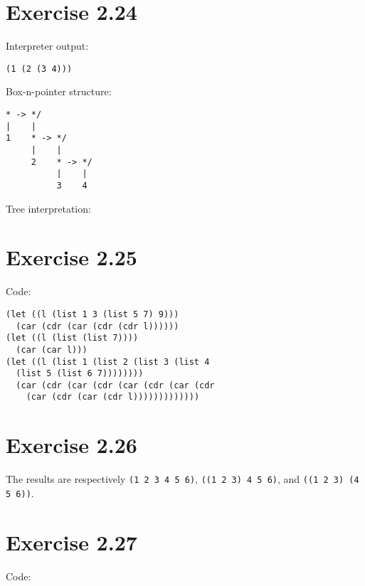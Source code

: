 \documentclass[../main.tex]{subfiles}
\begin{document}
\section{Exercise 2.24}

Interpreter output:

\begin{lstlisting}
(1 (2 (3 4)))
\end{lstlisting}

Box-n-pointer structure:

\begin{lstlisting}
* -> */
|    |
1    * -> */
     |    |
     2    * -> */
          |    |
          3    4
\end{lstlisting}

Tree interpretation:


\section{Exercise 2.25}

Code:

\begin{lstlisting}
(let ((l (list 1 3 (list 5 7) 9)))
  (car (cdr (car (cdr (cdr l))))))
(let ((l (list (list 7))))
  (car (car l)))
(let ((l (list 1 (list 2 (list 3 (list 4
  (list 5 (list 6 7))))))))
  (car (cdr (car (cdr (car (cdr (car (cdr
    (car (cdr (car (cdr l)))))))))))))
\end{lstlisting}

\section{Exercise 2.26}

The results are respectively
\lstinline{(1 2 3 4 5 6)},
\lstinline{((1 2 3) 4 5 6)},
and \lstinline{((1 2 3) (4 5 6))}.

\section{Exercise 2.27}

Code:
\end{document}
